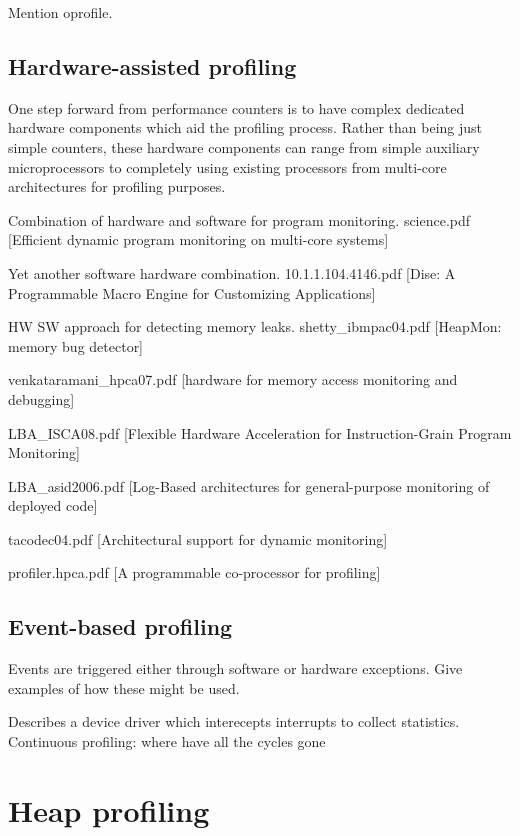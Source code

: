 Mention oprofile.

\subsection{Hardware-assisted profiling}
\label{subsection:hardwareassistedprofiling}

One step forward from performance counters is to have complex dedicated hardware components which aid the profiling process. Rather than being just simple counters, these hardware components can range from simple auxiliary microprocessors to completely using existing processors from multi-core architectures for profiling purposes.

Combination of hardware and software for program monitoring.
science.pdf [Efficient dynamic program monitoring on multi-core systems]

Yet another software hardware combination.
10.1.1.104.4146.pdf [Dise: A Programmable Macro Engine for Customizing Applications]

HW SW approach for detecting memory leaks.
shetty\_ibmpac04.pdf [HeapMon: memory bug detector]

venkataramani\_hpca07.pdf [hardware for memory access monitoring and debugging]

LBA\_ISCA08.pdf [Flexible Hardware Acceleration for Instruction-Grain Program Monitoring]

LBA\_asid2006.pdf [Log-Based architectures for general-purpose monitoring of deployed code]

tacodec04.pdf [Architectural support for dynamic monitoring]

profiler.hpca.pdf [A programmable co-processor for profiling]

\subsection{Event-based profiling}
\label{subsection:eventbasedprofiling}

Events are triggered either through software or hardware exceptions. Give examples of how these might be used.

Describes a device driver which interecepts interrupts to collect statistics.
Continuous profiling: where have all the cycles gone

\section{Heap profiling}
\label{section:heapprofiling}

